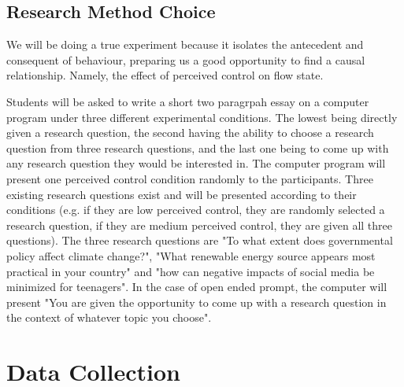 \documentclass{article}
\begin{document}
\subsection{Research Method Choice}

We will be doing a true experiment because it isolates the antecedent and consequent of behaviour, preparing us a good opportunity to find a causal relationship. Namely, the effect of perceived control on flow state.

Students will be asked to write a short two paragrpah essay on a computer program under three different experimental conditions. The lowest being directly given a research question, the second having the ability to choose a research question from three research questions, and the last one being to come up with any research question they would be interested in. The computer program will present one perceived control condition randomly to the participants. Three existing research questions exist and will be presented according to their conditions (e.g. if they are low perceived control, they are randomly selected a research question, if they are medium perceived control, they are given all three questions). The three research questions are "To what extent does governmental policy affect climate change?", "What renewable energy source appears most practical in your country" and "how can negative impacts of social media be minimized for teenagers". In the case of open ended prompt, the computer will present "You are given the opportunity to come up with a research question in the context of whatever topic you choose". 


%
\section{Data Collection}
    
\end{document}
